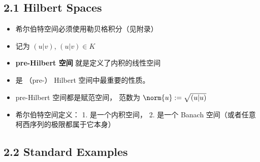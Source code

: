 
\subsection{2.1 Hilbert Spaces}
\begin{itemize}
\item 希尔伯特空间必须使用勒贝格积分（见附录）

\item {}记为 $(u|v)$, $(u|v) \in K$

\item \textbf{pre-Hilbert 空间}  就是定义了内积的线性空间

\item {}是 （pre-） Hilbert 空间中最重要的性质。

\item pre-Hilbert 空间都是赋范空间， 范数为 $\norm{u} := \sqrt{(u|u)}$

\item 希尔伯特空间定义： 1. 是一个内积空间， 2. 是一个 Banach 空间（或者任意柯西序列的极限都属于它本身）

\end{itemize}

\subsection{2.2 Standard Examples}

